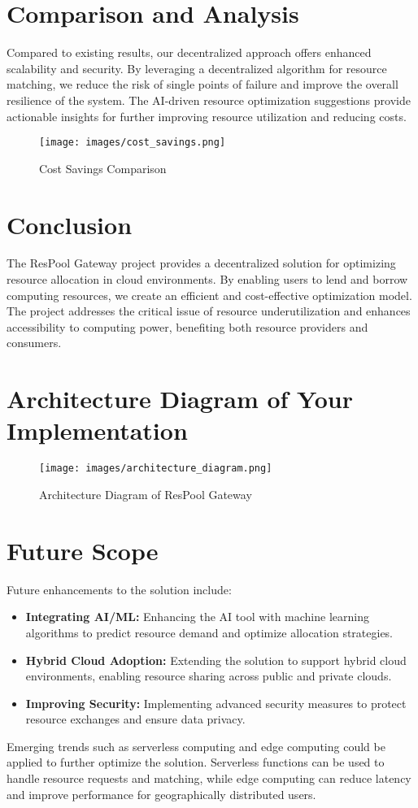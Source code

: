 \documentclass{article}
\begin{document}
\section{Comparison and Analysis}

Compared to existing results, our decentralized approach offers enhanced scalability and security. By leveraging a decentralized algorithm for resource matching, we reduce the risk of single points of failure and improve the overall resilience of the system. The AI-driven resource optimization suggestions provide actionable insights for further improving resource utilization and reducing costs.

\begin{figure}[h!]
    \centering
    \texttt{[image: images/cost\_savings.png]}
    \caption{Cost Savings Comparison}
    \label{fig:cost_savings}
\end{figure}

\section{Conclusion}

The ResPool Gateway project provides a decentralized solution for optimizing resource allocation in cloud environments. By enabling users to lend and borrow computing resources, we create an efficient and cost-effective optimization model. The project addresses the critical issue of resource underutilization and enhances accessibility to computing power, benefiting both resource providers and consumers.

\section{Architecture Diagram of Your Implementation}

\begin{figure}[h!]
    \centering
    \texttt{[image: images/architecture\_diagram.png]}
    \caption{Architecture Diagram of ResPool Gateway}
    \label{fig:architecture_diagram}
\end{figure}

\section{Future Scope}

Future enhancements to the solution include:

\begin{itemize}
    \item \textbf{Integrating AI/ML:} Enhancing the AI tool with machine learning algorithms to predict resource demand and optimize allocation strategies.
    \item \textbf{Hybrid Cloud Adoption:} Extending the solution to support hybrid cloud environments, enabling resource sharing across public and private clouds.
    \item \textbf{Improving Security:} Implementing advanced security measures to protect resource exchanges and ensure data privacy.
\end{itemize}

Emerging trends such as serverless computing and edge computing could be applied to further optimize the solution. Serverless functions can be used to handle resource requests and matching, while edge computing can reduce latency and improve performance for geographically distributed users.
\end{document}

